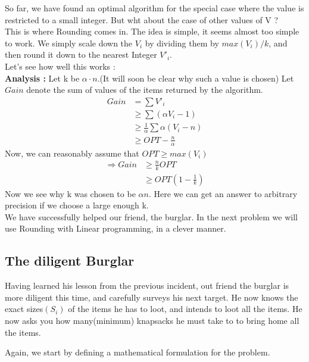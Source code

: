 \documentclass[12pt]{report}
\begin{document}
So far, we have found an optimal algorithm for the special case where the value is restricted to a small integer. But wht about the case of other values of V ?\\
This is where Rounding comes in. The idea is simple, it seems almost too simple to work. We simply scale down the $V_i$ by dividing them by $max(V_i)/k$, and then round it down to the nearest Integer $V'_i$.\\
Let's see how well this works :\\
\textbf{Analysis :} Let k be $\alpha \cdot n$.(It will soon be clear why such a value is chosen)
Let $Gain$ denote the sum of values of the items returned by the algorithm.
\begin{align*}
Gain &= \sum V'_i \\
	&\geq \sum (\alpha V_i - 1) \\
	&\geq \frac{1}{\alpha}\sum \alpha(V_i - n) \\
	&\geq OPT - \frac{n}{\alpha} 
\end{align*}
Now, we can reasonably assume that $OPT \geq max(V_i)$ 
\begin{align*}
\Rightarrow Gain &\geq \frac{n}{k}OPT \\
	&\geq  OPT (1-\frac{1}{k})
\end{align*}
Now we see why k was chosen to be $\alpha n$. Here we can get an answer to arbitrary precision if we choose a large enough k.
\\
We have successfully helped our friend, the burglar. In the next problem we will use Rounding with Linear programming, in a clever manner.

\subsection*{The diligent Burglar}
Having learned his lesson from the previous incident, out friend the burglar is more diligent this time, and carefully surveys his next target. He now knows the exact sizes$(S_i)$ of the items he has to loot, and intends to loot all the items. He now asks you how many(minimum) knapsacks he must take to to bring home all the items.

Again, we start by defining a mathematical formulation for the problem.
\end{document}

